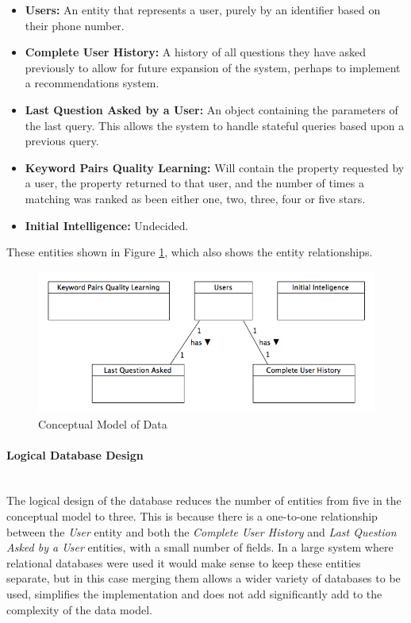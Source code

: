 \documentclass{article}
\newcommand{\myparagraph}[1]{\paragraph{#1}\mbox{}\\}
\begin{document}
\begin{itemize}
  \item {\bf Users:} An entity that represents a user, purely by an identifier based on their phone number.
  \item {\bf Complete User History:} A history of all questions they have asked previously to allow for future expansion of the system, perhaps to implement a recommendations system.
  \item {\bf Last Question Asked by a User:} An object containing the parameters of the last query.  This allows the system to handle stateful queries based upon a previous query.
  \item {\bf Keyword Pairs Quality Learning:} Will contain the property requested by a user, the property returned to that user, and the number of times a matching was ranked as been either one, two, three, four or five stars.
  \item {\bf Initial Intelligence:} \color{red} Undecided.
\end{itemize}

These entities shown in Figure \ref{fig:conceptualDatabaseDesignDiagram}, which also shows the entity relationships.

\begin{figure}[htb] 
\includegraphics[width=\linewidth]{conceptualModel}
\caption{Conceptual Model of Data}
\label{fig:conceptualDatabaseDesignDiagram}
\end{figure}

\myparagraph{Logical Database Design}
The logical design of the database reduces the number of entities from five in the conceptual model to three.  This is because there is a one-to-one relationship between the \textit{User} entity and both the \textit{Complete User History} and \textit{Last Question Asked by a User} entities, with a small number of fields.  In a large system where relational databases were used it would make sense to keep these entities separate, but in this case merging them allows a wider variety of databases to be used, simplifies the implementation and does not add significantly add to the complexity of the data model.
\end{document}
